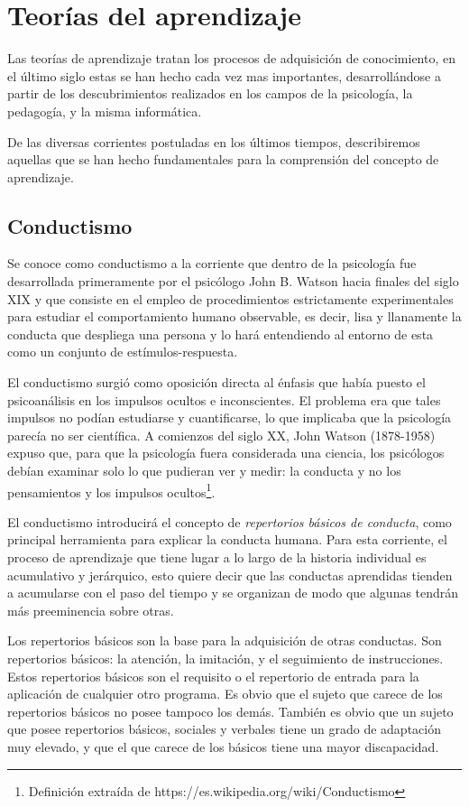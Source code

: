 \section{Teorías del aprendizaje}

Las teorías de aprendizaje tratan los procesos de adquisición de conocimiento,
en el último siglo estas se han hecho cada vez mas importantes, desarrollándose
a partir de los descubrimientos realizados en los campos de la psicología, la
pedagogía, y la misma informática.

De las diversas corrientes postuladas en los últimos tiempos, describiremos
aquellas que se han hecho fundamentales para la comprensión del concepto de
aprendizaje.

\subsection{Conductismo}

Se conoce como conductismo a la corriente que dentro de la psicología fue
desarrollada primeramente por el psicólogo John B. Watson hacia finales del
siglo XIX y que consiste en el empleo de procedimientos estrictamente
experimentales para estudiar el comportamiento humano observable, es decir,
lisa y llanamente la conducta que despliega una persona y lo hará entendiendo
al entorno de esta como un conjunto de estímulos-respuesta\cite{ABC}.

El conductismo surgió como oposición directa al énfasis que había puesto el
psicoanálisis en los impulsos ocultos e inconscientes. El problema era que tales
impulsos no podían estudiarse y cuantificarse, lo que implicaba que la
psicología parecía no ser científica. A comienzos del siglo XX, John Watson
(1878-1958) expuso que, para que la psicología fuera considerada una ciencia,
los psicólogos debían examinar solo lo que pudieran ver y medir: la conducta y
no los pensamientos y los impulsos ocultos\footnote{Definición extraída de
https://es.wikipedia.org/wiki/Conductismo}.

El conductismo introducirá el concepto de \emph{repertorios básicos de
conducta}, como principal herramienta para explicar la conducta humana. Para
esta corriente, el proceso de aprendizaje que tiene lugar a lo largo de la
historia individual es acumulativo y jerárquico, esto quiere decir que las
conductas aprendidas tienden a acumularse con el paso del tiempo y se organizan
de modo que algunas tendrán más preeminencia sobre otras.

Los repertorios básicos son la base para la adquisición de otras conductas. Son
repertorios básicos: la atención, la imitación, y el seguimiento de
instrucciones. Estos repertorios básicos son el requisito o el repertorio de
entrada para la aplicación de cualquier otro programa. Es obvio que el sujeto
que carece de los repertorios básicos no posee tampoco los demás. También es
obvio que un sujeto que posee repertorios básicos, sociales y verbales tiene un
grado de adaptación muy elevado, y que el que carece de los básicos tiene una
mayor discapacidad\cite{Glez}.


